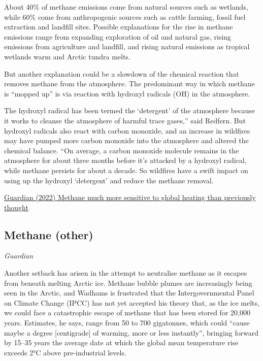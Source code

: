 \documentclass[
]{book}
\begin{document}
About 40\% of methane emissions come from natural sources such as wetlands, while 60\% come from anthropogenic sources such as cattle farming, fossil fuel extraction and landfill sites. Possible explanations for the rise in methane emissions range from expanding exploration of oil and natural gas, rising emissions from agriculture and landfill, and rising natural emissions as tropical wetlands warm and Arctic tundra melts.

But another explanation could be a slowdown of the chemical reaction that removes methane from the atmosphere. The predominant way in which methane is ``mopped up'' is via reaction with hydroxyl radicals (OH) in the atmosphere.

The hydroxyl radical has been termed the `detergent' of the atmosphere because it works to cleanse the atmosphere of harmful trace gases,'' said Redfern. But hydroxyl radicals also react with carbon monoxide, and an increase in wildfires may have pumped more carbon monoxide into the atmosphere and altered the chemical balance. ``On average, a carbon monoxide molecule remains in the atmosphere for about three months before it's attacked by a hydroxyl radical, while methane persists for about a decade. So wildfires have a swift impact on using up the hydroxyl `detergent' and reduce the methane removal.

\href{https://www.theguardian.com/environment/2022/jul/05/global-heating-causes-methane-growth-four-times-faster-than-thought-study}{Guardian (2022) Methane much more sensitive to global heating than previously thought}

\hypertarget{methane-other}{%
\subsection{Methane (other)}\label{methane-other}}

\emph{Guardian}

Another setback has arisen in the attempt to neutralise methane as it escapes from beneath melting Arctic ice. Methane bubble plumes are increasingly being seen in the Arctic, and Wadhams is frustrated that the Intergovernmental Panel on Climate Change (IPCC) has not yet accepted his theory that, as the ice melts, we could face a catastrophic escape of methane that has been stored for 20,000 years. Estimates, he says, range from 50 to 700 gigatonnes, which could ``cause maybe a degree {[}centigrade{]} of warming, more or less instantly'', bringing forward by 15--35 years the average date at which the global mean temperature rise exceeds 2°C above pre-industrial levels.
\end{document}
